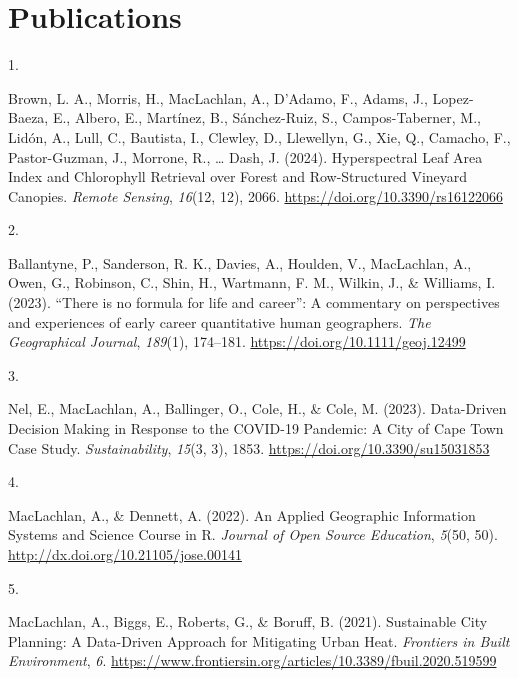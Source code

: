 \documentclass[11pt,a4paper,]{moderncv}
\newlength{\cslhangindent}
\newlength{\csllabelwidth}
\newenvironment{CSLReferences}[2] %
 {\begin{list}{}{%
  \setlength{\itemindent}{0pt}
  \setlength{\leftmargin}{0pt}
  \setlength{\parsep}{0pt}
  \ifodd #1
   \setlength{\leftmargin}{\cslhangindent}
   \setlength{\itemindent}{-1\cslhangindent}
  \fi
  \setlength{\itemsep}{#2\baselineskip}}}
 {\end{list}}
\newcommand{\CSLLeftMargin}[1]{\parbox[t]{\csllabelwidth}{\strut#1\strut}}
\newcommand{\CSLRightInline}[1]{\parbox[t]{\linewidth - \csllabelwidth}{\strut#1\strut}}
\begin{document}
\newpage

\section{Publications}\label{publications}

\label{refs-264ef67182648509a858ce40f870dae7}
\begin{CSLReferences}{0}{0}
\CSLLeftMargin{1. }%
\CSLRightInline{Brown, L. A., Morris, H., MacLachlan, A., D'Adamo, F.,
Adams, J., Lopez-Baeza, E., Albero, E., Martínez, B., Sánchez-Ruiz, S.,
Campos-Taberner, M., Lidón, A., Lull, C., Bautista, I., Clewley, D.,
Llewellyn, G., Xie, Q., Camacho, F., Pastor-Guzman, J., Morrone, R.,
\ldots{} Dash, J. (2024). Hyperspectral Leaf Area Index and Chlorophyll
Retrieval over Forest and Row-Structured Vineyard Canopies. \emph{Remote
Sensing}, \emph{16}(12, 12), 2066.
\url{https://doi.org/10.3390/rs16122066}}

\CSLLeftMargin{2. }%
\CSLRightInline{Ballantyne, P., Sanderson, R. K., Davies, A., Houlden,
V., MacLachlan, A., Owen, G., Robinson, C., Shin, H., Wartmann, F. M.,
Wilkin, J., \& Williams, I. (2023). {``There is no formula for life and
career''}: A commentary on perspectives and experiences of early career
quantitative human geographers. \emph{The Geographical Journal},
\emph{189}(1), 174--181. \url{https://doi.org/10.1111/geoj.12499}}

\CSLLeftMargin{3. }%
\CSLRightInline{Nel, E., MacLachlan, A., Ballinger, O., Cole, H., \&
Cole, M. (2023). Data-Driven Decision Making in Response to the COVID-19
Pandemic: A City of Cape Town Case Study. \emph{Sustainability},
\emph{15}(3, 3), 1853. \url{https://doi.org/10.3390/su15031853}}

\CSLLeftMargin{4. }%
\CSLRightInline{MacLachlan, A., \& Dennett, A. (2022). An Applied
Geographic Information Systems and Science Course in R. \emph{Journal of
Open Source Education}, \emph{5}(50, 50).
\url{http://dx.doi.org/10.21105/jose.00141}}

\CSLLeftMargin{5. }%
\CSLRightInline{MacLachlan, A., Biggs, E., Roberts, G., \& Boruff, B.
(2021). Sustainable City Planning: A Data-Driven Approach for Mitigating
Urban Heat. \emph{Frontiers in Built Environment}, \emph{6}.
\url{https://www.frontiersin.org/articles/10.3389/fbuil.2020.519599}}


\end{CSLReferences}
\end{document}
